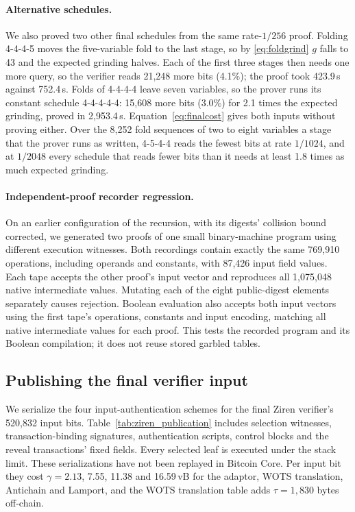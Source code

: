 \documentclass[11pt]{article}
\begin{document}
\paragraph{Alternative schedules.} We also proved two other final schedules
from the same rate-$1/256$ proof. Folding 4-4-4-5 moves the five-variable
fold to the last stage, so by \eqref{eq:foldgrind} $g$ falls to 43 and the
expected grinding halves. Each of the first three stages then needs one more
query, so the verifier reads 21{,}248 more bits (4.1\%); the proof took
423.9\,s against 752.4\,s. Folds of 4-4-4-4 leave seven variables, so the
prover runs its constant schedule 4-4-4-4-4: 15{,}608 more bits (3.0\%) for
2.1 times the expected grinding, proved in 2{,}953.4\,s.
Equation~\eqref{eq:finalcost} gives both inputs without proving either. Over
the 8{,}252 fold sequences of two to eight variables a stage that the prover
runs as written, 4-5-4-4 reads the fewest bits at rate $1/1024$, and at
$1/2048$ every schedule that reads fewer bits than it needs at least 1.8 times
as much expected grinding.

\paragraph{Independent-proof recorder regression.} On an earlier configuration of the recursion, with its digests' collision bound corrected, we generated two
proofs of one small binary-machine program using different execution
witnesses. Both recordings contain exactly the same 769{,}910 operations,
including operands and constants, with 87{,}426 input field values.
Each tape accepts the other proof's input vector and reproduces all
1{,}075{,}048 native intermediate values. Mutating each of the eight
public-digest elements separately causes rejection. Boolean evaluation also
accepts both input vectors using the first tape's operations, constants and
input encoding, matching all native intermediate values for each proof.
This tests the recorded program and its Boolean compilation; it does not
reuse stored garbled tables.

\subsection{Publishing the final verifier input}\label{sec:publication_eval}

We serialize the four input-authentication schemes for the final Ziren
verifier's 520{,}832 input bits. Table~\ref{tab:ziren_publication} includes
selection witnesses, transaction-binding signatures, authentication scripts,
control blocks and the reveal transactions' fixed fields. Every selected leaf is
executed under the stack limit. These serializations have not been replayed
in Bitcoin Core. Per input bit they cost $\gamma=2.13$, 7.55, 11.38 and
16.59\,vB for the adaptor, WOTS translation, Antichain and Lamport, and the
WOTS translation table adds $\tau=1{,}830$ bytes off-chain.
\end{document}
